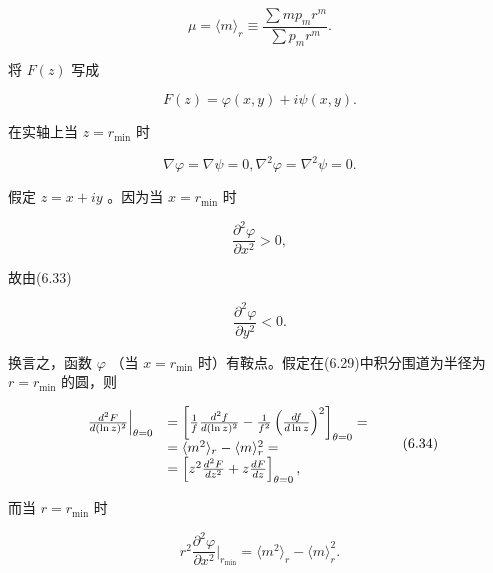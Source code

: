 \begin{equation*}
\mu = \langle m \rangle_ {r} \equiv \frac {\sum m p _ {m} r ^ {m}}{\sum p _ {m} r ^ {m}}.\tag{6.32}
\end{equation*}

将 $F(z)$ 写成

\begin{equation*}
F (z) = \varphi (x, y) + i \psi (x, y).
\end{equation*}

在实轴上当 $z = r_{\mathrm{min}}$ 时

\begin{equation*}
\nabla \varphi = \nabla \psi = 0, \nabla^ {2} \varphi = \nabla^ {2} \psi = 0.\tag{6.33}
\end{equation*}

假定 $z = x + iy$ 。因为当 $x = r_{\mathrm{min}}$ 时

\begin{equation*}
\frac {\partial^ {2} \varphi}{\partial x ^ {2}} > 0,
\end{equation*}

故由(6.33)

\begin{equation*}
\frac {\partial^ {2} \varphi}{\partial y ^ {2}} <   0.
\end{equation*}

换言之，函数 $\varphi$ （当 $x = r_{\min}$ 时）有鞍点。假定在(6.29)中积分围道为半径为 $r = r_{\min}$ 的圆，则

\begin{equation*}
\begin{array}{r l} \frac {d ^ {2} F}{d (\ln z) ^ {2}} \Big | _ {\theta = 0} & = \left[ \frac {1}{f} \frac {d ^ {2} f}{d (\ln z) ^ {2}} - \frac {1}{f ^ {2}} \left(\frac {d f}{d \ln z}\right) ^ {2} \right] _ {\theta = 0} = \\ & = \langle m ^ {2} \rangle_ {r} - \langle m \rangle_ {r} ^ {2} = \\ & = \left[ z ^ {2} \frac {d ^ {2} F}{d z ^ {2}} + z \frac {d F}{d z} \right] _ {\theta = 0}, \end{array} \tag{6.34}
\end{equation*}

而当 $r = r_{\mathrm{min}}$ 时

\begin{equation*}
r ^ {2} \frac {\partial^ {2} \varphi}{\partial x ^ {2}} \Big | _ {r _ {\min}} = \langle m ^ {2} \rangle_ {r} - \langle m \rangle_ {r} ^ {2}.\tag{6.35}
\end{equation*}

